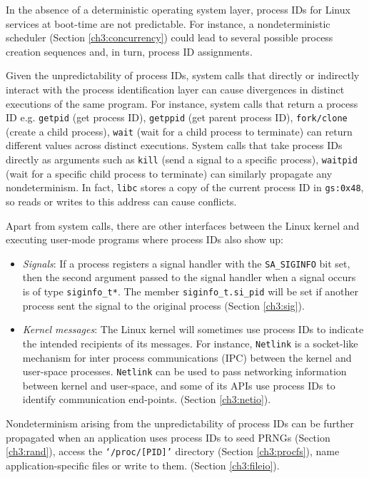 In the absence of a deterministic operating system layer, process IDs for
Linux services at boot-time are not predictable.
For instance, a nondeterministic scheduler (Section \ref{ch3:concurrency}) 
could lead to several possible process creation sequences
and, in turn, process ID assignments.

Given the unpredictability of process IDs,
system calls that directly or indirectly
interact with the process identification layer can cause divergences
in distinct executions of the same program.
For instance, system calls that return a process ID e.g.
\texttt{getpid} (get process ID), \texttt{getppid} (get
parent process ID), \texttt{fork/clone} (create a child process),
\texttt{wait} (wait for a child process to terminate)
can return different values across distinct executions. System calls that take process IDs 
directly as arguments such as \texttt{kill} (send a signal to a specific
process), \texttt{waitpid} (wait for a specific child process to terminate)
can similarly propagate any nondeterminism.
In fact, \texttt{libc} stores a copy of the current process ID in \texttt{gs:0x48},
so reads or writes to this address can cause conflicts.

Apart from system calls, there are other interfaces
between the Linux kernel and executing user-mode programs
where process IDs also show up:

\begin{itemize} 

\item {\em Signals}: If a process registers a signal handler with the \texttt{SA\_SIGINFO}
bit set, then the second argument passed
to the signal handler when a signal occurs is of type \texttt{siginfo\_t*}.
The member \texttt{siginfo\_t.si\_pid} will
be set if another process sent the signal 
to the original process (Section \ref{ch3:sig}). 

\item {\em Kernel messages}: The Linux kernel will sometimes use process IDs 
to indicate the intended recipients of its messages. 
For instance, \texttt{Netlink} is a socket-like
mechanism for inter process communications (IPC)
between the kernel and user-space processes.
\texttt{Netlink} can be used to pass
networking information between kernel
and user-space, and some of its APIs 
use process IDs to identify communication
end-points. (Section \ref{ch3:netio}). \end{itemize}

\newpage 
Nondeterminism arising from the unpredictability of process IDs can be
further propagated when an application uses process IDs to seed PRNGs 
(Section \ref{ch3:rand}), access the \texttt{`/proc/[PID]'} directory
(Section \ref{ch3:procfs}), name application-specific files or 
write to them. (Section \ref{ch3:fileio}). 

